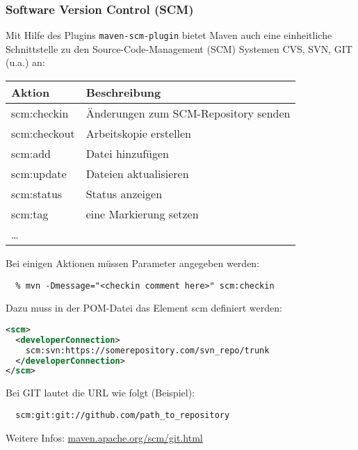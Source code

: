 \subsubsection{Software Version Control (SCM)}
Mit Hilfe des Plugins \verb+maven-scm-plugin+
bietet Maven auch eine einheitliche Schnittstelle zu
den Source-Code-Management (SCM) Systemen CVS, SVN, GIT (u.a.) an:
\begin{center}
\begin{tabular}{l|l}
Aktion & Beschreibung\\
\hline
 scm:checkin & Änderungen zum SCM-Repository senden\\
 scm:checkout & Arbeitskopie erstellen\\
 scm:add     & Datei hinzufügen\\
 scm:update  & Dateien aktualisieren \\
 scm:status & Status anzeigen\\
 scm:tag    & eine Markierung setzen\\
 \ldots
\end{tabular}
\end{center}
Bei einigen Aktionen müssen Parameter angegeben werden:
\begin{lstlisting}
  % mvn -Dmessage="<checkin comment here>" scm:checkin
\end{lstlisting}
Dazu muss in der POM-Datei das Element scm definiert werden:
\begin{lstlisting}[language=xml,
  morekeywords={scm,connection,developerConnection,url}]
<scm>
  <developerConnection>
    scm:svn:https://somerepository.com/svn_repo/trunk
  </developerConnection>
</scm>
\end{lstlisting}
Bei GIT lautet die URL wie folgt (Beispiel):
\begin{lstlisting}
  scm:git:git://github.com/path_to_repository
\end{lstlisting}
Weitere Infos: \href{http://maven.apache.org/scm/git.html}
                    {maven.apache.org/scm/git.html}
\newslide

